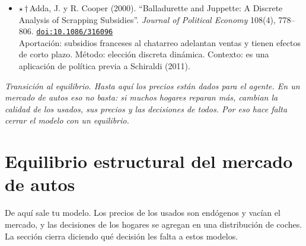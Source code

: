 \documentclass[11pt]{article}
\begin{document}
\begin{itemize}
Aportación: estima y agrega reglas (S,s) en la compra de automóviles. Método: microdatos de hogares. Contexto: es una forma reducida de la inercia que tu modelo genera con costos de transacción.
\item $\star$\,$\dagger$\,Adda, J. y R. Cooper (2000). ``Balladurette and Juppette: A Discrete Analysis of Scrapping Subsidies''. \textit{Journal of Political Economy} 108(4), 778--806. \href{https://doi.org/10.1086/316096}{\texttt{doi:10.1086/316096}}\\
Aportación: subsidios franceses al chatarreo adelantan ventas y tienen efectos de corto plazo. Método: elección discreta dinámica. Contexto: es una aplicación de política previa a Schiraldi (2011).
\end{itemize}

\medskip
\noindent\textit{Transición al equilibrio. Hasta aquí los precios están dados para el agente. En un mercado de autos eso no basta: si muchos hogares reparan más, cambian la calidad de los usados, sus precios y las decisiones de todos. Por eso hace falta cerrar el modelo con un equilibrio.}

\section{Equilibrio estructural del mercado de autos}
De aquí sale tu modelo. Los precios de los usados son endógenos y vacían el mercado, y las decisiones de los hogares se agregan en una distribución de coches. La sección cierra diciendo qué decisión les falta a estos modelos.
\end{document}
